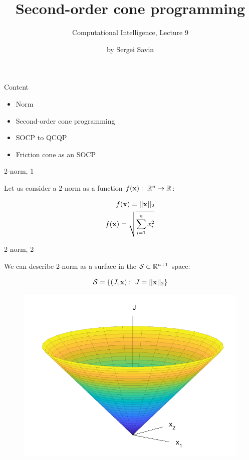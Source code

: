 \documentclass{beamer}
\title{Second-order cone programming}
\subtitle{Computational Intelligence, Lecture 9}
\author{by Sergei Savin}
\date{\mydate}
\begin{document}
\maketitle


\begin{frame}{Content}

\begin{itemize}
	\item  Norm
\item  Second-order cone programming
\item  SOCP to QCQP
\item  Friction cone as an SOCP
\end{itemize}

\end{frame}






\begin{frame}{2-norm, 1}
	\begin{flushleft}
		
		Let us consider a 2-norm as a function $f(\mathbf{x}): \ \mathbb{R}^n \rightarrow \mathbb{R}$:
		
		\begin{align}
			f(\mathbf{x}) = || \mathbf{x} ||_2
			\\
			f(\mathbf{x}) = \sqrt{ \sum_{i=1}^n x_i^2 }
		\end{align}
		
	\end{flushleft}
\end{frame}


\begin{frame}{2-norm, 2}
	\begin{flushleft}
		
		We can describe 2-norm as a surface in the $\mathcal S \subset \mathbb{R}^{n+1}$ space:
		
		\begin{align}
			\mathcal S = \{  (J, \mathbf{x}): \ J = || \mathbf{x} ||_2 \}
		\end{align}		
		
		\begin{figure}
			\centering
			\includegraphics[width=0.7\linewidth]{norm}
			\label{fig:norm}
		\end{figure}
		
	\end{flushleft}
\end{frame}
\end{document}
